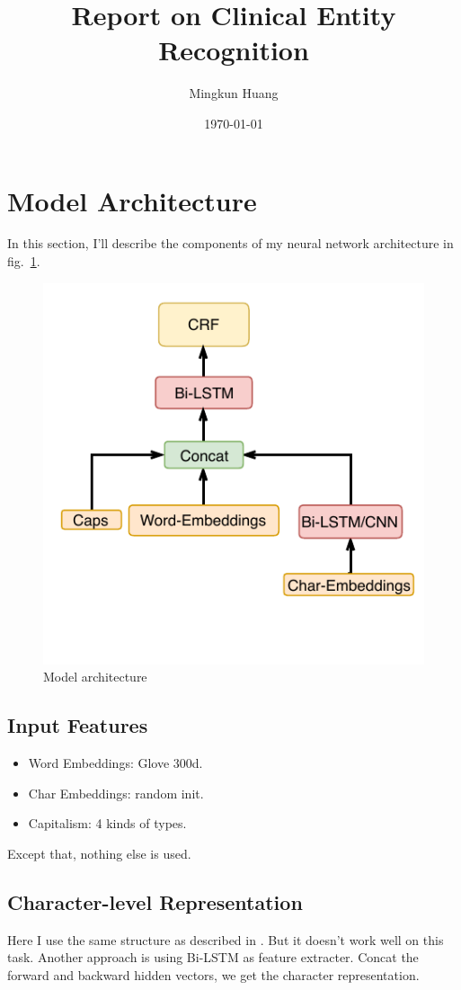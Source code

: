 \documentclass{article}
\title{Report on Clinical Entity Recognition}
\author{Mingkun Huang}
\date{\today}
\begin{document}
\maketitle

\section{Model Architecture}
In this section, I'll describe the components of my neural network architecture in fig.~\ref{fig:arch}.
\begin{figure}[tbh]
    \centering
    \includegraphics{blstm-crf}
    \caption{Model architecture}
    \label{fig:arch}
\end{figure}

\subsection{Input Features}
\begin{itemize}
    \item Word Embeddings: Glove 300d.
    \item Char Embeddings: random init.
    \item Capitalism: 4 kinds of types.
\end{itemize}
Except that, nothing else is used.

\subsection{Character-level Representation}
Here I use the same structure as described in \cite{e2ecrf2016}. But it doesn't work well on
this task. Another approach is using Bi-LSTM as feature extracter. Concat the forward and backward 
hidden vectors, we get the character representation.
\end{document}
